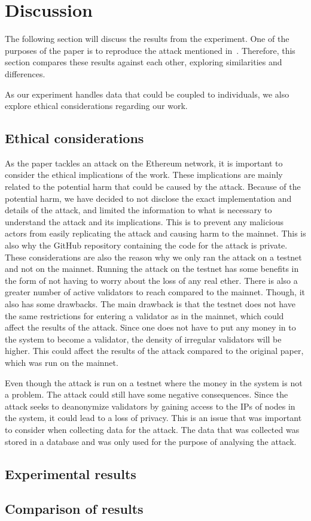 

\section{Discussion}\label{sec:discussion}
The following section will discuss the results from the experiment.
One of the purposes of the paper is
to reproduce the attack mentioned in~\cite{heimbach2024deanonymizingethereumvalidatorsp2p}.
Therefore, this section compares these results against each other, exploring similarities and differences.


As our experiment handles data that could be coupled to individuals,
we also explore ethical considerations regarding our work.


\subsection{Ethical considerations}\label{subsec:ethical-considerations}
As the paper tackles an attack on the Ethereum network,
it is important to consider the ethical implications of the work.
These implications are mainly related to the potential harm that could be caused by the attack.
Because of the potential harm, we have decided to not disclose the exact implementation and details of the attack,
and limited the information to what is necessary to understand the attack and its implications.
This is to prevent any malicious actors from easily replicating the attack and causing harm to the mainnet.
This is also why the GitHub repository containing the code for the attack is private.
These considerations are also the reason why we only ran the attack on a testnet and not on the mainnet.
Running the attack on the testnet has some benefits in the form
of not having to worry about the loss of any real ether.
There is also a greater number of active validators to reach compared to the mainnet.
Though, it also has some drawbacks.
The main drawback is that the testnet does not have the same restrictions for entering a validator as in the mainnet,
which could affect the results of the attack.
Since one does not have to put any money in to the system to become a validator,
the density of irregular validators will be higher.
This could affect the results of the attack compared to the original paper, which was run on the mainnet.

Even though the attack is run on a testnet where the money in the system is not a problem.
The attack could still have some negative consequences.
Since the attack seeks to deanonymize validators by gaining access to the IPs of nodes in the system, it could lead to a loss of privacy.
This is an issue that was important to consider when collecting data for the attack.
The data that was collected was stored in a database and was only used for the purpose of analysing the attack.

\subsection{Experimental results}\label{subsec:expres}

\subsection{Comparison of results}\label{subsec:res-comparison}